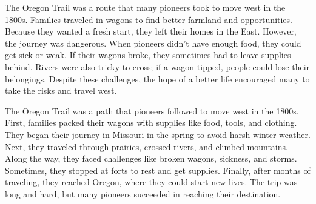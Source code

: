 \documentclass[12pt]{article}
\begin{document}
\begin{tcolorbox}[colframe=black!60, colback=white, 
coltitle=black, colbacktitle=black!15, fonttitle=\bfseries\Large, 
title=Text 1: Why Families Traveled the Oregon Trail, halign title=center, left=10pt, right=10pt, top=10pt, bottom=15pt]
The Oregon Trail was a route that many pioneers took to move west in the 1800s. Families traveled in wagons to find better farmland and opportunities. Because they wanted a fresh start, they left their homes in the East. However, the journey was dangerous. When pioneers didn’t have enough food, they could get sick or weak. If their wagons broke, they sometimes had to leave supplies behind. Rivers were also tricky to cross; if a wagon tipped, people could lose their belongings. Despite these challenges, the hope of a better life encouraged many to take the risks and travel west. 


     \end{tcolorbox}
\begin{tcolorbox}[colframe=black!60, colback=white, 
coltitle=black, colbacktitle=black!15, fonttitle=\bfseries\Large, 
title=Text 2: The Journey Along the Oregon Trail, halign title=center, left=10pt, right=10pt, top=10pt, bottom=15pt]
The Oregon Trail was a path that pioneers followed to move west in the 1800s. First, families packed their wagons with supplies like food, tools, and clothing. They began their journey in Missouri in the spring to avoid harsh winter weather. Next, they traveled through prairies, crossed rivers, and climbed mountains. Along the way, they faced challenges like broken wagons, sickness, and storms. Sometimes, they stopped at forts to rest and get supplies. Finally, after months of traveling, they reached Oregon, where they could start new lives. The trip was long and hard, but many pioneers succeeded in reaching their destination. 



 

     \end{tcolorbox}
\vspace{1em}
\end{document}
